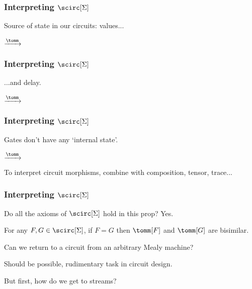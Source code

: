 \begin{frame}
    \frametitle{Interpreting \(\scirc[\Sigma]\)}    

    Source of \alert{state} in our circuits: \alert{values}...

    \pause

    \begin{center}
        \qquad
        \pause
        \(\xrightarrow{\tomm}\)
        \qquad
        \raisebox{-1.25em}{}
    \end{center}
\end{frame}

\begin{frame}
    \frametitle{Interpreting \(\scirc[\Sigma]\)}    
    ...and \alert{delay}.

    \pause
    \begin{center}
        \qquad
        \pause
        \(\xrightarrow{\tomm}\)
        \qquad
        \raisebox{-8em}{}
    \end{center}
\end{frame}


\begin{frame}
    \frametitle{Interpreting \(\scirc[\Sigma]\)}

    Gates don't have any `internal state'.

    \pause

    \begin{center}
        \qquad
        \pause
        \(\xrightarrow{\tomm}\)
        \qquad
        \raisebox{-1em}{}
    \end{center}

    \pause

    To interpret circuit morphisms, combine with composition, tensor, trace...

\end{frame}


\begin{frame}
    \frametitle{Interpreting \(\scirc[\Sigma]\)}

    Do all the axioms of \(\scirc[\Sigma]\) hold in this prop? \pause \alert{Yes.}

    \pause

    \begin{theorem}
        For any \(F,G \in \scirc[\Sigma]\), if \(F = G\) then \(\tomm[F]\) and \(\tomm[G]\) are bisimilar.
    \end{theorem}

    \pause

    Can we return to a circuit from an arbitrary Mealy machine? 

    \pause

    Should be possible, rudimentary task in circuit design.
 
    \pause

    But first, how do we get to \alert{streams}?

\end{frame}